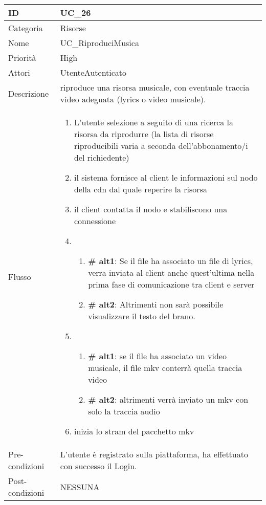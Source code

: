 \begin{center}
\begin{tabular}{ |p{2cm}|p{13cm}|  }
\hline
ID & UC\_26 \\\hline
Categoria & Risorse\\\hline
Nome & UC\_RiproduciMusica\\\hline
Priorità & High \\\hline
Attori &  UtenteAutenticato \\\hline
Descrizione & riproduce una risorsa musicale, con eventuale traccia video adeguata (lyrics o video musicale).\\\hline
Flusso &  	\begin{enumerate}
			\item L'utente selezione a seguito di una ricerca la risorsa da riprodurre (la lista di risorse riproducibili varia a seconda dell'abbonamento/i del richiedente)
			\item il sistema fornisce al client le informazioni sul nodo della cdn dal quale reperire la risorsa 
			\item il client contatta il nodo e stabiliscono una connessione
			\item \begin{enumerate}[label= ]
				\item \textbf{\# alt1}: Se il file ha associato un file di lyrics, verra inviata al client anche quest'ultima nella prima fase di comunicazione tra client e server
				\item \textbf{\# alt2}: Altrimenti non sarà possibile visualizzare il testo del brano.
			\end{enumerate}
			\item \begin{enumerate}[label= ]
				\item \textbf{\# alt1}: se il file ha associato un video musicale, il file mkv conterrà quella traccia video
				\item \textbf{\# alt2}: altrimenti verrà inviato un mkv con solo la traccia audio
			\end{enumerate}
			\item inizia lo stram del pacchetto mkv
			\end{enumerate}
			\\\hline
Pre-condizioni & L'utente è registrato sulla piattaforma, ha effettuato con successo il Login.\\\hline
Post-condizioni & NESSUNA\\\hline
\end{tabular}
\label{table_use_case:26}\newline


\end{center}
